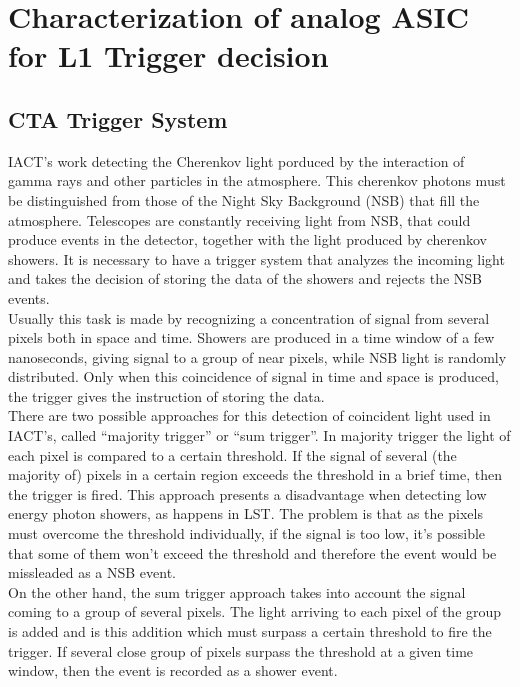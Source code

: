 \documentclass[a4paper,10pt]{book}
\begin{document}
\chapter{Characterization of analog ASIC for L1 Trigger decision}\label{cap.introduccion}
\section{CTA Trigger System}
IACT's work detecting the Cherenkov light porduced by the interaction of gamma rays and other particles in the 
atmosphere. This cherenkov photons must be distinguished from those of the Night Sky Background (NSB) that fill 
the atmosphere. Telescopes are constantly receiving light from NSB, that could produce events in the detector,
together with the light produced by cherenkov showers. It is necessary to have a trigger system that analyzes 
the incoming light and takes the decision of storing the data of the showers and rejects the NSB events.\\
Usually this task is made by recognizing a concentration of signal from several pixels both in space and time. 
Showers are produced in a time window of a few nanoseconds, giving signal to a group of near pixels, while NSB light
is randomly distributed. Only when this coincidence of signal in time and space is produced, the trigger gives the 
instruction of storing the data.\\

There are two possible approaches for this detection of coincident light used in IACT's, called 
``majority trigger'' or ``sum trigger''. In majority trigger the light of each pixel is compared to a certain
threshold. If the signal of several (the majority of) pixels in a certain region exceeds the threshold in a brief time, 
then the trigger is fired. This approach presents a disadvantage when detecting low energy photon showers,
as happens in LST. The problem is that as the pixels must overcome the threshold individually, if the signal 
is too low, it's possible  that some of them won't exceed the threshold and therefore the event would be missleaded as a NSB event.\\

On the other hand, the sum trigger approach takes into account the signal coming to a group of several pixels. 
The light arriving to each pixel of the group is added and is this addition which must surpass a certain threshold to
fire the trigger. If several close group of pixels surpass the threshold at a given time window, then
the event is recorded as a shower event.\\
\end{document}
